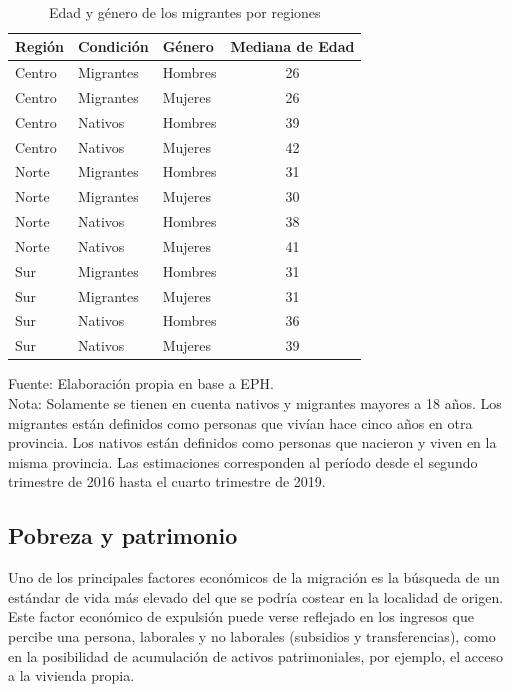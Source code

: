 \documentclass[12pt,a4paper]{article}
\begin{document}
\begin{table}[htbp!]
\caption{\\Edad y género de los migrantes por regiones} 
\centering
\footnotesize
\begin{tabular}{lllc}
  \hline
  \hline
Región & Condición & Género & Mediana de Edad \\ 
  \hline
  \hline
 Centro & Migrantes & Hombres & 26 \\ 
 Centro & Migrantes & Mujeres & 26 \\ 
 Centro & Nativos & Hombres & 39 \\ 
 Centro & Nativos & Mujeres & 42 \\ 
 Norte & Migrantes & Hombres & 31\\ 
 Norte & Migrantes & Mujeres & 30 \\ 
 Norte & Nativos & Hombres & 38 \\ 
 Norte & Nativos & Mujeres & 41 \\ 
 Sur & Migrantes & Hombres & 31 \\ 
 Sur & Migrantes & Mujeres & 31 \\ 
 Sur & Nativos & Hombres & 36\\ 
 Sur & Nativos & Mujeres & 39 \\ 
   \hline
\end{tabular}
\label{cuadro:edad_mig}
\begin{flushleft}
\begin{scriptsize}
Fuente: Elaboración propia en base a EPH.\\
Nota: Solamente se tienen en cuenta nativos y migrantes mayores a 18 años. Los migrantes están definidos como personas que vivían hace cinco años en otra provincia. Los nativos están definidos como personas que nacieron y viven en la misma provincia. Las estimaciones corresponden al período desde el segundo trimestre de 2016 hasta el cuarto trimestre de 2019.\\
\end{scriptsize}
\end{flushleft}
\end{table}


\newpage
\subsection{Pobreza y patrimonio}

Uno de los principales factores económicos de la migración es la búsqueda de un estándar de vida más elevado del que se podría costear en la localidad de origen. Este factor económico de expulsión puede verse reflejado en los ingresos que percibe una persona, laborales y no laborales (subsidios y transferencias), como en la posibilidad de acumulación de activos patrimoniales, por ejemplo, el acceso a la vivienda propia.
\end{document}
